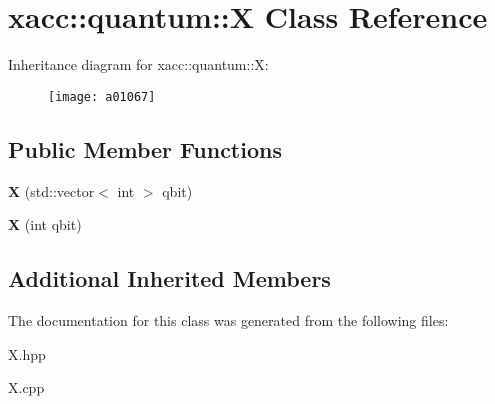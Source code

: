 \hypertarget{a01067}{}\section{xacc\+:\+:quantum\+:\+:X Class Reference}
\label{a01067}
Inheritance diagram for xacc\+:\+:quantum\+:\+:X\+:\begin{figure}[H]
\begin{center}
\leavevmode
\texttt{[image: a01067]}
\end{center}
\end{figure}
\subsection*{Public Member Functions}
\begin{DoxyCompactItemize}
\item 
\mbox{\label{a01067_aedc541a302602154847118f73b040510}} 
{\bfseries X} (std\+::vector$<$ int $>$ qbit)
\item 
\mbox{\label{a01067_a1159bd01929b59277b4524ccfcfd7440}} 
{\bfseries X} (int qbit)
\end{DoxyCompactItemize}
\subsection*{Additional Inherited Members}


The documentation for this class was generated from the following files\+:\begin{DoxyCompactItemize}
\item 
X.\+hpp\item 
X.\+cpp\end{DoxyCompactItemize}
